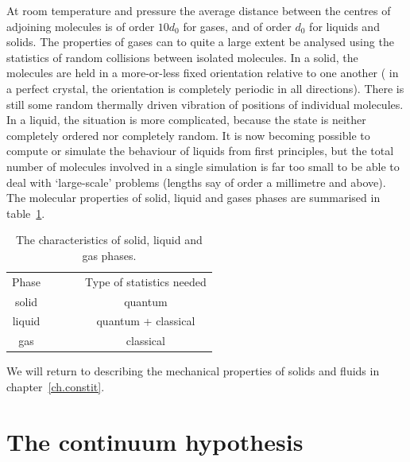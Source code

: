 \documentclass[a4paper,11pt]		{report}
\begin{document}
At room temperature and pressure the average distance between the
centres of adjoining molecules is of order $10d_0$ for gases, and of
order $d_0$ for liquids and solids. The properties of gases can to
quite a large extent be analysed using the statistics of random
collisions between isolated molecules. In a solid, the molecules are
held in a more-or-less fixed orientation relative to one another (\eg
in a perfect crystal, the orientation is completely periodic in all
directions). There is still some random thermally driven vibration of
positions of individual molecules. In a liquid, the situation is more
complicated, because the state is neither completely ordered nor
completely random. It is now becoming possible to compute or simulate
the behaviour of liquids from first principles, but the total number
of molecules involved in a single simulation is far too small to be
able to deal with `large-scale' problems (lengths say of order a
millimetre and above). The molecular properties of solid, liquid and
gases phases are summarised in table~\ref{tab.bat1}.

\begin{table}
\begin{center}
\begin{tabular}{cp{25mm}p{35mm}p{28mm}p{30mm} }
\hline
Phase & 
\centering{Intermolecular forces} & 
\centering{Ratio of random thermal movement of molecules to $d_0$} &
\centering{Molecular arrangement} &
Type of statistics needed \\[5pt]
solid & \centering{strong} & 
\centering{$\ll1$} & \centering{ordered} & \multicolumn{1}{c}{quantum} \\
liquid & \centering{medium} & 
\centering{${\cal O}(1)$} & \centering{partially ordered} & \multicolumn{1}{c}{quantum + classical} \\
gas & \centering{weak} & \centering{$\gg1$} & \centering{disordered} &
\multicolumn{1}{c}{classical} \\ \hline
\end{tabular}
\end{center}
\caption{The characteristics of solid, liquid and gas
  phases. \citep[From][]{bat67}}
\label{tab.bat1}
\end{table}

We will return to describing the mechanical properties of solids and
fluids in chapter~\ref{ch.constit}.

\section{The continuum hypothesis}
\end{document}
